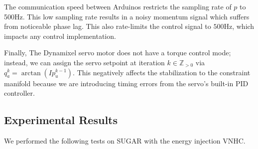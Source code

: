 \documentclass[journal,twoside,web, twocolumn,draftcls]{ieeecolor}
\begin{document}
The communication speed between Arduinos restricts the sampling rate of \(p\) to
500Hz.
This low sampling rate results in a noisy momentum signal which suffers
from noticeable phase lag.
This also rate-limits the control signal to \(500\)Hz, which impacts any control
implementation.

Finally, The Dynamixel servo motor does not have a torque control mode; instead,
we can assign the servo setpoint at iteration \(k \in \mathbb{Z}_{> 0}\)
via \(q_a^{k} = \arctan(I p_u^{k-1})\).
This negatively affects the stabilization to the constraint
manifold because we are introducing timing errors from the servo's built-in PID
controller.

\subsection{Experimental Results}

We performed the following tests on SUGAR with the energy injection VNHC.
\end{document}

